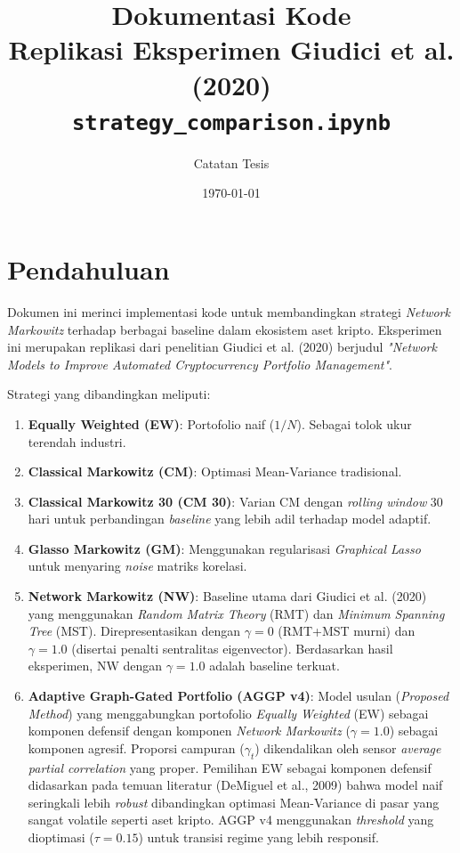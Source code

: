 \documentclass[12pt,a4paper]{article}
\title{\textbf{Dokumentasi Kode} \\ \large Replikasi Eksperimen Giudici et al. (2020) \\
\small \texttt{strategy\_comparison.ipynb}}
\author{Catatan Tesis}
\date{\today}
\begin{document}
\maketitle
\tableofcontents
\newpage

\section{Pendahuluan}
Dokumen ini merinci implementasi kode untuk membandingkan strategi \textit{Network Markowitz} terhadap berbagai baseline dalam ekosistem aset kripto. Eksperimen ini merupakan replikasi dari penelitian Giudici et al. (2020) berjudul \textit{"Network Models to Improve Automated Cryptocurrency Portfolio Management"}.

Strategi yang dibandingkan meliputi:
\begin{enumerate}
    \item \textbf{Equally Weighted (EW)}: Portofolio naif ($1/N$). Sebagai tolok ukur terendah industri.
    \item \textbf{Classical Markowitz (CM)}: Optimasi Mean-Variance tradisional.
    \item \textbf{Classical Markowitz 30 (CM 30)}: Varian CM dengan \textit{rolling window} 30 hari untuk perbandingan \textit{baseline} yang lebih adil terhadap model adaptif.
    \item \textbf{Glasso Markowitz (GM)}: Menggunakan regularisasi \textit{Graphical Lasso} untuk menyaring \textit{noise} matriks korelasi.
    \item \textbf{Network Markowitz (NW)}: Baseline utama dari Giudici et al. (2020) yang menggunakan \textit{Random Matrix Theory} (RMT) dan \textit{Minimum Spanning Tree} (MST). Direpresentasikan dengan $\gamma=0$ (RMT+MST murni) dan $\gamma=1.0$ (disertai penalti sentralitas eigenvector). Berdasarkan hasil eksperimen, NW dengan $\gamma=1.0$ adalah baseline terkuat.
    \item \textbf{Adaptive Graph-Gated Portfolio (AGGP v4)}: Model usulan (\textit{Proposed Method}) yang menggabungkan portofolio \textit{Equally Weighted} (EW) sebagai komponen defensif dengan komponen \textit{Network Markowitz} ($\gamma=1.0$) sebagai komponen agresif. Proporsi campuran ($\gamma_t$) dikendalikan oleh sensor \textit{average partial correlation} yang proper. Pemilihan EW sebagai komponen defensif didasarkan pada temuan literatur (DeMiguel et al., 2009) bahwa model naif seringkali lebih \textit{robust} dibandingkan optimasi Mean-Variance di pasar yang sangat volatile seperti aset kripto. AGGP v4 menggunakan \textit{threshold} yang dioptimasi ($\tau=0.15$) untuk transisi regime yang lebih responsif.
\end{enumerate}
\end{document}
